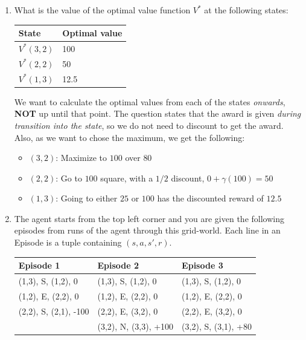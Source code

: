 \documentclass[12pt]{article}
\begin{document}
\begin{enumerate}

\item What is the value of the optimal value function $V^*$ at the following states:
  
  \begin{center}\begin{tabular}{|l|l|} \hline
  \bf State  & \bf Optimal value \\ \hline
  $V^*(3,2)$ & 100\\
  $V^*(2,2)$ & 50\\
  $V^*(1,3)$ & 12.5\\ \hline
  \end{tabular}\end{center}

We want to calculate the optimal values from each of the states {\em onwards}, {\bf NOT} up until that point. The question states that the award is given {\em during transition into the state}, so we do not need to discount to get the award. Also, as we want to chose the maximum, we get the following:

\begin{itemize}
  \item $(3,2)$: Maximize to $100$ over $80$
  \item $(2,2)$: Go to $100$ square, with a $1/2$ discount, $0 + \gamma(100) = 50$
  \item $(1,3)$: Going to either $25$ or $100$ has the discounted reward of $12.5$
\end{itemize}

\item The agent starts from the top left corner and you are given the
  following episodes from runs of the agent through this
  grid-world. Each line in an Episode is a tuple containing $(s, a,
  s', r)$.

\begin{table}[htb!]
  \centering
\begin{tabular}{l|l|l}
Episode 1 & Episode 2 & Episode 3\\
\hline
(1,3), S, (1,2), 0 & (1,3), S, (1,2), 0 & (1,3), S, (1,2), 0 \\
(1,2), E, (2,2), 0 & (1,2), E, (2,2), 0 & (1,2), E, (2,2), 0 \\
(2,2), S, (2,1), -100 & (2,2), E, (3,2), 0 & (2,2), E, (3,2), 0 \\ 
  & (3,2), N, (3,3), +100 & (3,2), S, (3,1), +80 \\ 
 \hline
\end{tabular}
\end{table}


\end{enumerate}
\end{document}
